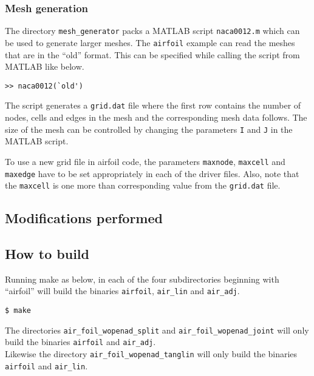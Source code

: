 \subsubsection{Mesh generation}\label{mesh_gen}
The directory \texttt{mesh\_generator} packs a MATLAB script \texttt{naca0012.m} which can be used to generate larger meshes. The \texttt{airfoil} example can read the meshes that are in the ``old'' format. This can be specified while calling the script from MATLAB like below.
\hfill\break
\begin{lstlisting}[language=mymatlab, numbers=none]
>> naca0012(`old')
\end{lstlisting}
The script generates a \texttt{grid.dat} file where the first row contains the number of nodes, cells and edges in the mesh and the corresponding mesh data follows. The size of the mesh can be controlled by changing the parameters \texttt{I} and \texttt{J} in the MATLAB script.

\begin{NotePar}
\noindent To use a new grid file in airfoil code, the parameters \texttt{maxnode}, \texttt{maxcell} and \texttt{maxedge} have to be set appropriately in each of the driver files. Also, note that the \texttt{maxcell} is one more than corresponding value from the \texttt{grid.dat} file.
\end{NotePar}
\subsection{Modifications performed}
%
\subsection{How to build}
Running make as below, in each of the four subdirectories beginning with ``airfoil'' will build the  binaries \texttt{airfoil}, \texttt{air\_lin} and \texttt{air\_adj}.
\hfill\break
\begin{lstlisting}[language=mybash, numbers=none]
    $ make
\end{lstlisting}
\begin{NotePar}
\noindent  The directories \texttt{air\_foil\_wopenad\_split} and \texttt{air\_foil\_wopenad\_joint} will only build the binaries \texttt{airfoil} and \texttt{air\_adj}.\\

\noindent Likewise the directory \texttt{air\_foil\_wopenad\_tanglin} will only build the binaries \texttt{airfoil} and \texttt{air\_lin}.
\end{NotePar}
